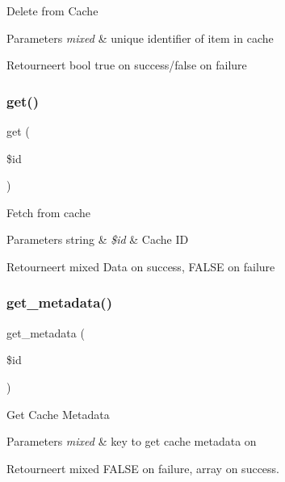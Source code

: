 Delete from Cache


\begin{DoxyParams}{Parameters}
{\em mixed} & unique identifier of item in cache \\
\hline
\end{DoxyParams}
\begin{DoxyReturn}{Retourneert}
bool true on success/false on failure 
\end{DoxyReturn}
\mbox{\label{class_c_i___cache__file_a50e3bfb586b2f42932a6a93f3fbb0828}} 
\subsubsection{\texorpdfstring{get()}{get()}}
{\footnotesize\ttfamily get (\begin{DoxyParamCaption}\item[{}]{\$id }\end{DoxyParamCaption})}

Fetch from cache


\begin{DoxyParams}[1]{Parameters}
string & {\em \$id} & Cache ID \\
\hline
\end{DoxyParams}
\begin{DoxyReturn}{Retourneert}
mixed Data on success, F\+A\+L\+SE on failure 
\end{DoxyReturn}
\mbox{\label{class_c_i___cache__file_a59635cf18e997c5141bffa05ff7622e0}} 
\subsubsection{\texorpdfstring{get\_metadata()}{get\_metadata()}}
{\footnotesize\ttfamily get\+\_\+metadata (\begin{DoxyParamCaption}\item[{}]{\$id }\end{DoxyParamCaption})}

Get Cache Metadata


\begin{DoxyParams}{Parameters}
{\em mixed} & key to get cache metadata on \\
\hline
\end{DoxyParams}
\begin{DoxyReturn}{Retourneert}
mixed F\+A\+L\+SE on failure, array on success. 
\end{DoxyReturn}
\mbox{\label{class_c_i___cache__file_a2f07a4e09b57f4460d49852497d1808f}} 
